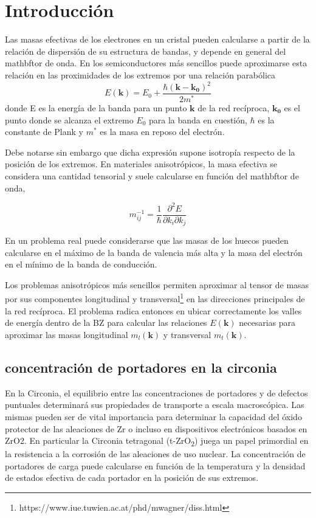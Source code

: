 \section{Introducción}
Las masas efectivas de los electrones en un cristal pueden calcularse
a partir de la relación de dispersión de su estructura de bandas, y depende 
en general del mathbftor de onda. En los
semiconductores más sencillos puede aproximarse esta relación 
en las proximidades de los extremos por una
relación parabólica
\begin{equation}\label{EqParabolica}
  E(\mathbf{k}) = E_0 + \dfrac{\hbar (\mathbf{k}-\mathbf{k_0})^2}{2 m^{*}}
\end{equation}
donde E es la energía de la banda para un punto $\mathbf{k}$ de la red recíproca, $\mathbf{k_0}$
es 
el punto donde se alcanza el extremo $E_0$ para la banda en cuestión, $\hbar$ es la constante de 
Plank y $m^{*}$ es la masa en reposo del electrón. 

Debe notarse sin embargo que dicha expresión supone isotropía respecto de la posición 
de los extremos. En materiales anisotrópicos, la masa efectiva se considera una cantidad
tensorial y suele calcularse en función del mathbftor de onda,

\begin{equation}\label{EqTensorDefinition}
  m_{ij}^{-1} = \frac{1}{\hbar}\dfrac{\partial^2 E}{\partial k_i  \partial k_j}
\end{equation}

En un problema real puede considerarse que las masas de los huecos pueden calcularse
en el máximo de la banda de valencia más alta y la masa del electrón en el mínimo de la banda
de conducción. 

Los problemas anisotrópicos más sencillos permiten aproximar al tensor de masas por sus
componentes longitudinal y transversal\footnote{ https://www.iue.tuwien.ac.at/phd/mwagner/diss.html}
en las direcciones principales de la red recíproca. 
El problema radica entonces en ubicar correctamente los valles de energía dentro de la BZ
para calcular las relaciones $E(\mathbf{k})$ necesarias para aproximar las masas longitudinal 
$m_l(\mathbf{k})$ y transversal $m_t(\mathbf{k})$.

\subsection{concentración de portadores en la circonia}

En la Circonia, el equilibrio entre las  concentraciones de portadores 
y de defectos puntuales determinará sus propiedades de transporte a escala macroscópica.  Las
mismas pueden ser de vital importancia para determinar la capacidad del óxido protector
de las aleaciones de Zr o incluso en dispositivos electrónicos basados en ZrO2. En particular
la Circonia tetragonal (t-ZrO\textsubscript{2}) juega un papel primordial en la resistencia
a la corrosión de las aleaciones de uso nuclear. 
La concentración de portadores de carga puede calcularse en función de la temperatura y la densidad
de estados efectiva de cada portador en la posición de sus extremos. 

